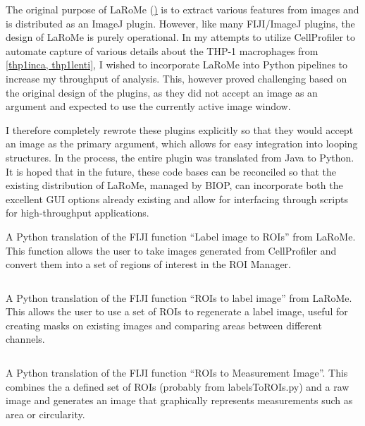 The original purpose of LaRoMe (\href{https://github.com/BIOP/ijp-LaRoMe}) is to extract various features from images and is distributed as an ImageJ plugin. However, like many FIJI/ImageJ plugins, the design of LaRoMe is purely operational. In my attempts to utilize CellProfiler \citep{Carpenter2006, Kamentsky2011, McQuin2018, Stirling2021} to automate capture of various details about the THP-1 macrophages from \autoref{thp1inca, thp1lenti}, I wished to incorporate LaRoMe into Python pipelines to increase my throughput of analysis. This, however proved challenging based on the original design of the plugins, as they did not accept an image as an argument and expected to use the currently active image window.

I therefore completely rewrote these plugins explicitly so that they would accept an image as the primary argument, which allows for easy integration into looping structures. In the process, the entire plugin was translated from Java to Python. It is hoped that in the future, these code bases can be reconciled so that the existing distribution of LaRoMe, managed by BIOP, can incorporate both the excellent GUI options already existing and allow for interfacing through scripts for high-throughput applications.

\begin{code}
\caption{A Python translation of the FIJI function ``Label image to ROIs'' from LaRoMe. This function allows the user to take images generated from CellProfiler and convert them into a set of regions of interest in the ROI Manager.}
\label{l2r}

\inputminted[breaklines,frame=single,fontsize=\small]{python}{source/labelsToROIs.py}

\end{code}



\begin{code}
\caption{A Python translation of the FIJI function ``ROIs to label image'' from LaRoMe. This allows the user to use a set of ROIs to regenerate a label image, useful for creating masks on existing images and comparing areas between different channels.}
\label{r2l}

\inputminted[breaklines,frame=single,fontsize=\small]{python}{source/ROIsTolabels.py}

\end{code}



\begin{code}
\caption{A Python translation of the FIJI function ``ROIs to Measurement Image''. This combines the a defined set of ROIs (probably from labelsToROIs.py) and a raw image and generates an image that graphically represents measurements such as area or circularity.}
\label{r2m}

\inputminted[breaklines,frame=single,fontsize=\small]{python}{source/ROIsToMap.py}

\end{code}



